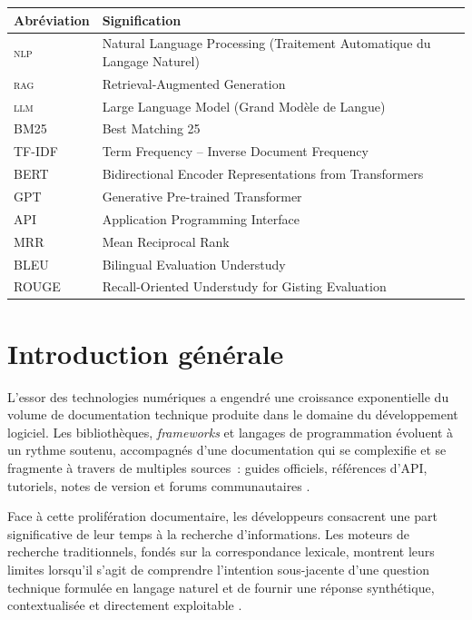 \documentclass[12pt,a4paper,oneside]{report}
\newcommand{\rag}{\textsc{rag}}
\newcommand{\nlp}{\textsc{nlp}}
\newcommand{\llm}{\textsc{llm}}
\begin{document}
\begin{tabular}{ll}
\toprule
\textbf{Abréviation} & \textbf{Signification} \\
\midrule
\nlp{}   & Natural Language Processing (Traitement Automatique du Langage Naturel) \\
\rag{}   & Retrieval-Augmented Generation \\
\llm{}   & Large Language Model (Grand Modèle de Langue) \\
BM25     & Best Matching 25 \\
TF-IDF   & Term Frequency -- Inverse Document Frequency \\
BERT     & Bidirectional Encoder Representations from Transformers \\
GPT      & Generative Pre-trained Transformer \\
API      & Application Programming Interface \\
MRR      & Mean Reciprocal Rank \\
BLEU     & Bilingual Evaluation Understudy \\
ROUGE    & Recall-Oriented Understudy for Gisting Evaluation \\
\bottomrule
\end{tabular}

\newpage
{}
\setcounter{page}{1}

\chapter{Introduction générale}

L'essor des technologies numériques a engendré une croissance exponentielle du volume de documentation technique produite dans le domaine du développement logiciel. Les bibliothèques, \textit{frameworks} et langages de programmation évoluent à un rythme soutenu, accompagnés d'une documentation qui se complexifie et se fragmente à travers de multiples sources~: guides officiels, références d'API, tutoriels, notes de version et forums communautaires \citep{gao2024}.

Face à cette prolifération documentaire, les développeurs consacrent une part significative de leur temps à la recherche d'informations. Les moteurs de recherche traditionnels, fondés sur la correspondance lexicale, montrent leurs limites lorsqu'il s'agit de comprendre l'intention sous-jacente d'une question technique formulée en langage naturel et de fournir une réponse synthétique, contextualisée et directement exploitable \citep{barnett2024}.
\end{document}
